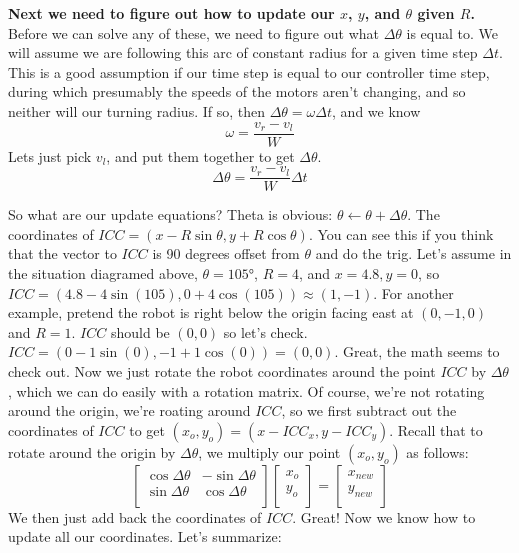 \documentclass{article}
\begin{document}
\textbf{Next we need to figure out how to update our $x$, $y$, and $\theta$ given $R$.} \\

Before we can solve any of these, we need to figure out what $\Delta\theta$ is equal to. We will assume we are following this arc of constant radius for a given time step $\Delta t$. This is a good assumption if our time step is equal to our controller time step, during which presumably the speeds of the motors aren't changing, and so neither will our turning radius. If so, then $\Delta\theta = \omega\Delta t$, and we know
$$\omega=\frac{v_r - v_l}{W}$$
Lets just pick $v_l$, and put them together to get $\Delta\theta$.
$$\Delta\theta = \frac{v_r - v_l}{W}\Delta t$$

So what are our update equations? Theta is obvious: $\theta \leftarrow \theta+\Delta\theta$. The coordinates of $ICC = (x-R\sin{\theta}, y+R\cos{\theta})$. You can see this if you think that the vector to $ICC$ is 90 degrees offset from $\theta$ and do the trig. Let's assume in the situation diagramed above, $\theta=\ang{105}$, $R=4$, and $x=4.8, y=0$, so $ICC = (4.8-4\sin{(105)}, 0+4\cos{(105)}) \approx (1, -1)$. For another example, pretend the robot is right below the origin facing east at $(0,-1,0)$ and $R=1$. $ICC$ should be $(0,0)$ so let's check. $ICC = (0-1\sin{(0)}, -1+1\cos{(0)}) = (0, 0).$ Great, the math seems to check out. Now we just rotate the robot coordinates around the point $ICC$ by $\Delta\theta$, which we can do easily with a rotation matrix. Of course, we're not rotating around the origin, we're roating around $ICC$, so we first subtract out the coordinates of $ICC$ to get $(x_o, y_o) = (x- ICC_x, y-ICC_y)$. Recall that to rotate around the origin by $\Delta\theta$, we multiply our point $(x_o, y_o)$ as follows:
\begin{equation}
  \begin{bmatrix}
    \cos{\Delta\theta} & -\sin{\Delta\theta} \\
    \sin{\Delta\theta} & \cos{\Delta\theta} \\
  \end{bmatrix}
  \begin{bmatrix}
    x_o \\
    y_o \\
  \end{bmatrix}
  =
  \begin{bmatrix}
    x_{new} \\
    y_{new} \\
  \end{bmatrix}
\end{equation}
We then just add back the coordinates of $ICC$. Great! Now we know how to update all our coordinates. Let's summarize:
\end{document}
